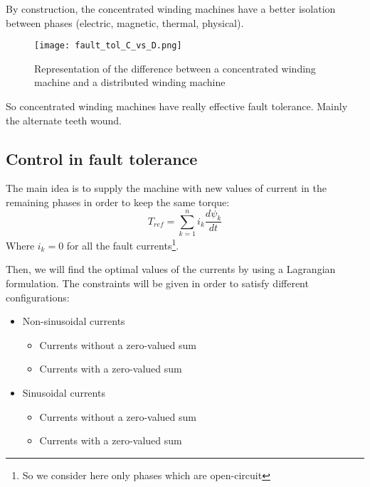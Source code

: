By construction, the concentrated winding machines have a better isolation between phases (electric, magnetic, thermal, physical).
\begin{figure}[H]
    \centering
    \texttt{[image: fault\_tol\_C\_vs\_D.png]}
    \caption{Representation of the difference between a concentrated winding machine and a distributed winding machine}
    \label{fig:fault_CvsD}
\end{figure}
So concentrated winding machines have really effective fault tolerance. Mainly the alternate teeth wound. 

\subsection{Control in fault tolerance}
The main idea is to supply the machine with new values of current in the remaining phases in order to keep the same torque:
\begin{equation}
    T_{ref} = \sum_{k=1}^n i_k \frac{d\psi_k}{dt}
\end{equation}
Where $i_k = 0$ for all the fault currents\footnote{So we consider here only phases which are open-circuit}. 

Then, we will find the optimal values of the currents by using a Lagrangian formulation. The constraints will be given in order to satisfy different configurations:
\begin{itemize}
    \item Non-sinusoidal currents
    \begin{itemize}
        \item Currents without a zero-valued sum
        \item Currents with a zero-valued sum
    \end{itemize}
    \item Sinusoidal currents
    \begin{itemize}
        \item Currents without a zero-valued sum
        \item Currents with a zero-valued sum
    \end{itemize}
\end{itemize}

